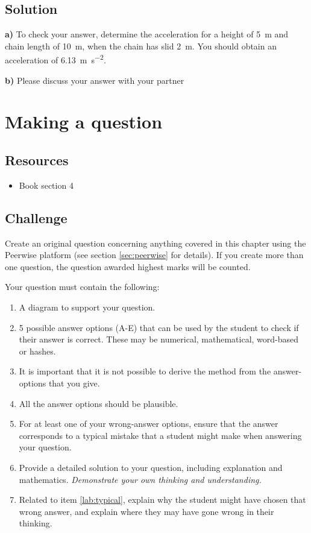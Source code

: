 \subsection*{Solution}
\textbf{a)} To check your answer, determine the acceleration for a height of \SI{5}{\meter} and chain length of \SI{10}{\meter}, when the chain has slid \SI{2}{m}. You should obtain an acceleration of \SI{6.13}{\meter\per\square\second}.

\textbf{b)} Please discuss your answer with your partner



\newpage
\section{Making a question}


\subsection*{Resources}
\begin{itemize}
    \item Book section 4
\end{itemize}

\subsection*{Challenge}
Create an original question concerning anything covered in this chapter using the Peerwise platform (see section \ref{sec:peerwise} for details). If you create more than one question, the question awarded highest marks will be counted.

Your question must contain the following:
\begin{enumerate}
    \item A diagram to support your question.
    \item 5 possible answer options (A-E) that can be used by the student to check if their answer is correct. These may be numerical, mathematical, word-based or hashes.
    \item It is important that it is not possible to derive the method from the answer-options that you give.
    \item All the answer options should be plausible.
    \item For at least one of your wrong-answer options, ensure that the answer corresponds to a typical mistake that a student might make when answering your question. \label{lab:typical}
    \item Provide a detailed solution to your question, including explanation and mathematics. \emph{Demonstrate your own thinking and understanding.}
    \item Related to item \ref{lab:typical}, explain why the student might have chosen that wrong answer, and explain where they may have gone wrong in their thinking.
\end{enumerate}




